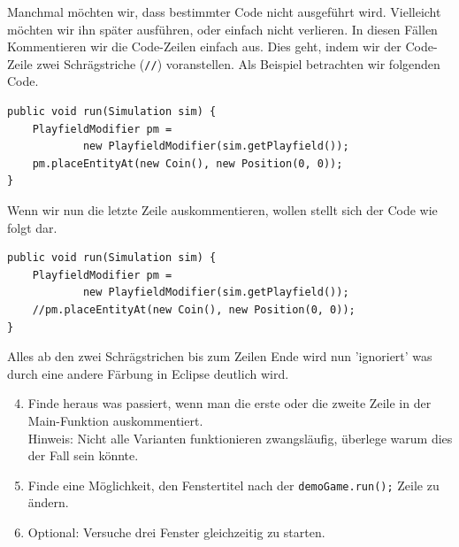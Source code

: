\begin{Infobox}
    Manchmal möchten wir, dass bestimmter Code nicht ausgeführt wird. Vielleicht möchten wir ihn später ausführen, oder einfach nicht verlieren.
    In diesen Fällen Kommentieren wir die Code-Zeilen einfach aus.
    Dies geht, indem wir der Code-Zeile zwei Schrägstriche ({\color{javagreen}\texttt{//}}) voranstellen.
    Als Beispiel betrachten wir folgenden Code.\\

    \hfill
    \begin{minipage}{.96\textwidth}
        \begin{lstlisting}
public void run(Simulation sim) {
    PlayfieldModifier pm =
            new PlayfieldModifier(sim.getPlayfield());
    pm.placeEntityAt(new Coin(), new Position(0, 0));
}
        \end{lstlisting}
    \end{minipage}

    Wenn wir nun die letzte Zeile auskommentieren, wollen stellt sich der Code wie folgt dar.\\

    \hfill
    \begin{minipage}{.96\textwidth}
        \begin{lstlisting}
public void run(Simulation sim) {
    PlayfieldModifier pm =
            new PlayfieldModifier(sim.getPlayfield());
    //pm.placeEntityAt(new Coin(), new Position(0, 0));
}
        \end{lstlisting}
    \end{minipage}

    Alles ab den zwei Schrägstrichen bis zum Zeilen Ende wird nun 'ignoriert' was durch eine andere Färbung in Eclipse deutlich wird.
\end{Infobox}

\begin{enumerate}[label=\alph*)] \setcounter{enumi}{3}
    \item Finde heraus was passiert, wenn man die erste oder die zweite Zeile in der Main-Funktion auskommentiert.\\
    Hinweis: Nicht alle Varianten funktionieren zwangsläufig, überlege warum dies der Fall sein könnte.
    \item Finde eine Möglichkeit, den Fenstertitel nach der \texttt{demoGame.run();} Zeile zu ändern.
    \item Optional: Versuche drei Fenster gleichzeitig zu starten.
\end{enumerate}
